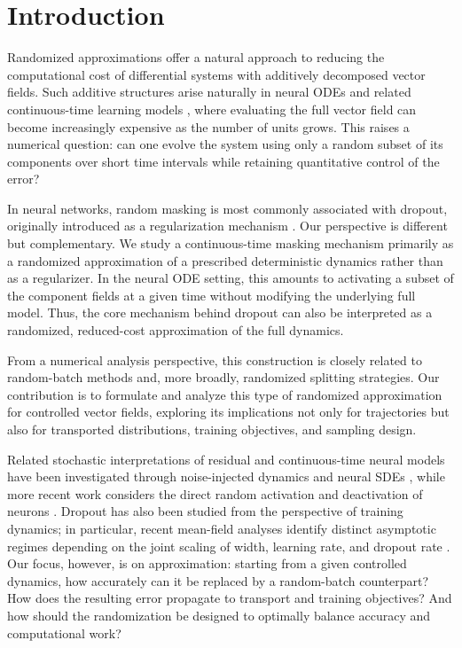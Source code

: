 \documentclass[twoside,11pt]{article}
\theoremstyle{plain}
\begin{document}
\setcounter{tocdepth}{2}
\tableofcontents
\vspace{0.5cm}




\section{Introduction}

Randomized approximations offer a natural approach to reducing the computational cost of differential systems with additively decomposed vector fields. Such additive structures arise naturally in neural ODEs and related
continuous-time learning models \cite{ChenRBD18,weinan,haber}, where
evaluating the full vector field can become increasingly expensive
as the number of units grows. This raises a  numerical question: can one evolve the system using only a random subset of its components over short time intervals while retaining quantitative control of the error?

In neural networks, random masking is most commonly associated with dropout, originally introduced as a regularization mechanism \cite{srivastava2014dropout,pmlrwan13}. Our perspective is different but complementary. We study a continuous-time masking mechanism primarily as a randomized approximation of a prescribed deterministic dynamics rather than as a regularizer. In the neural ODE setting, this amounts to activating a subset of the component fields at a given time without modifying the underlying full model. Thus, the core mechanism behind dropout can also be interpreted as a randomized, reduced-cost approximation of the full dynamics.

From a numerical analysis perspective, this construction is closely related to random-batch methods and, more broadly, randomized splitting strategies. Our contribution is to formulate and analyze this type of randomized approximation for controlled vector fields, exploring its implications not only for trajectories but also for transported distributions, training objectives, and sampling design.

Related stochastic interpretations of residual and continuous-time neural models have been investigated through noise-injected dynamics and neural SDEs \cite{Sun2018StochasticTO,Liu2020_Neural_SDE}, while more recent work considers the direct random activation and deactivation of neurons \cite{lee2026neural}. Dropout has also been studied from the perspective of training dynamics; in particular, recent mean-field analyses identify distinct asymptotic regimes depending on the joint scaling of width, learning rate, and dropout rate \cite{chizat2025phasediagramdropouttwolayer}. Our focus, however, is on approximation: starting from a given controlled dynamics, how accurately can it be replaced by a random-batch counterpart? How does the resulting error propagate to transport and training objectives? And how should the randomization be designed to optimally balance accuracy and computational work?
\end{document}
